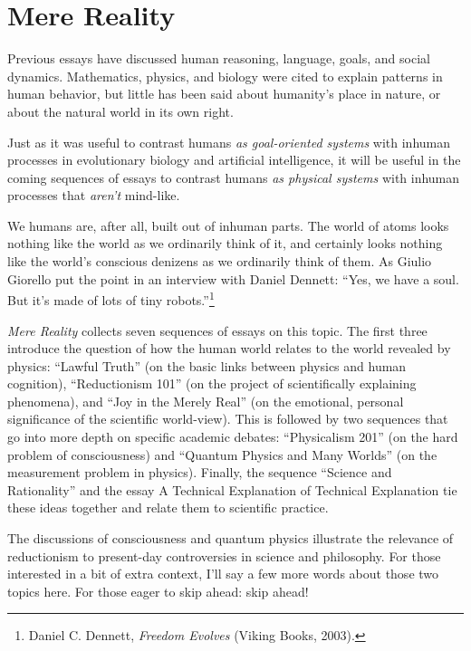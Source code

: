 \part{Mere Reality}



{
 Previous essays have discussed human reasoning, language, goals,
and social dynamics. Mathematics, physics, and biology were cited to
explain patterns in human behavior, but little has been said about
humanity's place in nature, or about the natural world
in its own right.}

{
 Just as it was useful to contrast humans \textit{as goal-oriented
systems} with inhuman processes in evolutionary biology and artificial
intelligence, it will be useful in the coming sequences of essays to
contrast humans \textit{as physical systems} with inhuman processes
that \textit{aren't} mind-like.}

{
 We humans are, after all, built out of inhuman parts. The world of
atoms looks nothing like the world as we ordinarily think of it, and
certainly looks nothing like the world's conscious
denizens as we ordinarily think of them. As Giulio Giorello put the
point in an interview with Daniel Dennett: ``Yes, we
have a soul. But it's made of lots of tiny
robots.''\footnote{Daniel C. Dennett, \textit{Freedom Evolves} (Viking Books,
2003).}}

{
 \textit{Mere Reality} collects seven sequences of essays on this
topic. The first three introduce the question of how the human world
relates to the world revealed by physics: ``Lawful
Truth'' (on the basic links between physics and human
cognition), ``Reductionism 101'' (on
the project of scientifically explaining phenomena), and
``Joy in the Merely Real'' (on the
emotional, personal significance of the scientific world-view). This is
followed by two sequences that go into more depth on specific academic
debates: ``Physicalism 201'' (on the
hard problem of consciousness) and ``Quantum Physics
and Many Worlds'' (on the measurement problem in
physics). Finally, the sequence ``Science and
Rationality'' and the essay A Technical Explanation
of Technical Explanation tie these ideas together and relate them to
scientific practice.}

{
 The discussions of consciousness and quantum physics illustrate
the relevance of reductionism to present-day controversies in science
and philosophy. For those interested in a bit of extra context,
I'll say a few more words about those two topics here.
For those eager to skip ahead: skip ahead!}

